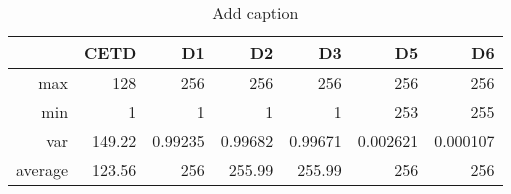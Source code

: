 \begin{table}[htbp]
  \centering
  \caption{Add caption}
    \begin{tabular}{rrrrrrr}
    \toprule
          & CETD  & D1    & D2    & D3    & D5    & D6 \\
    \midrule
    max   & 128   & 256   & 256   & 256   & 256   & 256 \\
    min   & 1     & 1     & 1     & 1     & 253   & 255 \\
    var   & 149.22 & 0.99235 & 0.99682 & 0.99671 & 0.002621 & 0.000107 \\
    average & 123.56 & 256   & 255.99 & 255.99 & 256   & 256 \\
    \bottomrule
    \end{tabular}%
  \label{tab:addlabel}%
\end{table}%
